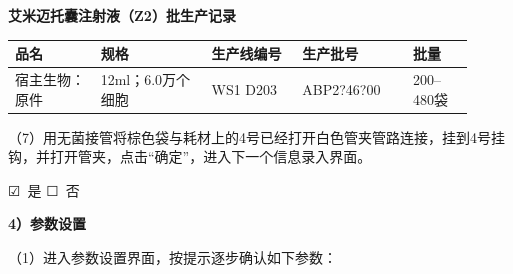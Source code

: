 \documentclass[UTF8,10pt,a4paper,fontset=fandol]{ctexart}
\newcommand{\fieldvalue}[1]{#1}
\newcommand{\handwritten}[1]{#1}
\newcommand{\checkboxfield}[1]{\ifstrequal{#1}{checked}{☑}{\ifstrequal{#1}{unclear}{?}{☐}}}
\begin{document}
\newpage

\begin{center}
\textbf{艾米迈托囊注射液（Z2）批生产记录}
\end{center}

\begin{tabular}{|p{0.17\linewidth}|p{0.22\linewidth}|p{0.18\linewidth}|p{0.22\linewidth}|p{0.12\linewidth}|}
\hline
品名 & 规格 & 生产线编号 & 生产批号 & 批量 \\
\hline
宿主生物：
\fieldvalue{原件}
&
12ml；6.0万个细胞
&
\fieldvalue{\handwritten{WS1 D203}}
&
\fieldvalue{\handwritten{ABP2?46?00}}
&
\fieldvalue{200--480袋}
\\
\hline
\end{tabular}

\vspace{0.5em}

（7）用无菌接管将棕色袋与耗材上的4号已经打开白色管夹管路连接，挂到4号挂钩，并打开管夹，点击“确定”，进入下一个信息录入界面。

\noindent
\fieldvalue{\handwritten{\checkboxfield{checked}}}\ 是
\quad
\fieldvalue{\checkboxfield{unchecked}}\ 否

\vspace{0.5em}

\textbf{4）参数设置}

（1）进入参数设置界面，按提示逐步确认如下参数：
\end{document}
